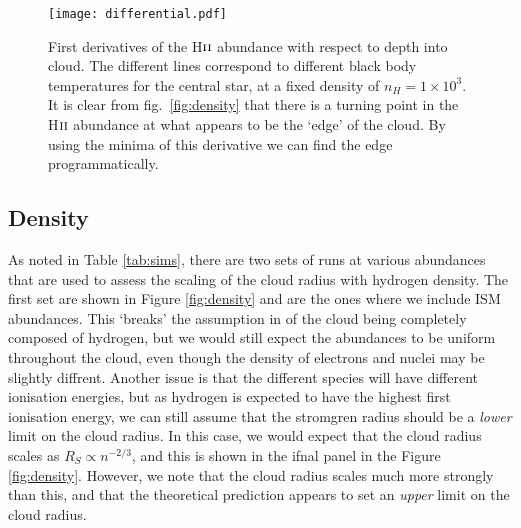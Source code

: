 \documentclass[a4paper]{article}
\begin{document}
\begin{figure}[!h]
\centering
\texttt{[image: differential.pdf]}
\caption{First derivatives of the H$\textsc{ii}$ abundance with
respect to depth into cloud. The different lines correspond to different
black body temperatures for the central star, at a fixed density of
$n_H = 1\times 10^3$. It is clear from fig.~\ref{fig:density} that
there is a turning point in the H$\textsc{ii}$ abundance at what
appears to be the `edge' of the cloud. By using the minima of this
derivative we can find the edge programmatically.}\label{fig:derivative}
\end{figure}

\subsection{Density}

As noted in Table \ref{tab:sims}, there are two sets of runs at various
abundances that are used to assess the scaling of the cloud radius with
hydrogen density. The first set are shown in Figure \ref{fig:density} and are
the ones where we include ISM abundances. This `breaks' the assumption in
\citet{stromgren_physical_1939} of the cloud being completely composed of
hydrogen, but we would still expect the abundances to be uniform throughout the
cloud, even though the density of electrons and nuclei may be slightly
diffrent. Another issue is that the different species will have different
ionisation energies, but as hydrogen is expected to have the highest first
ionisation energy, we can still assume that the stromgren radius should be a
\emph{lower} limit on the cloud radius. In this case, we would expect that the
cloud radius scales as $R_S \propto n^{-2/3}$, and this is shown in the ifnal
panel in the Figure \ref{fig:density}. However, we note that the cloud radius
scales much more strongly than this, and that the theoretical prediction
appears to set an \emph{upper} limit on the cloud radius.
\end{document}
